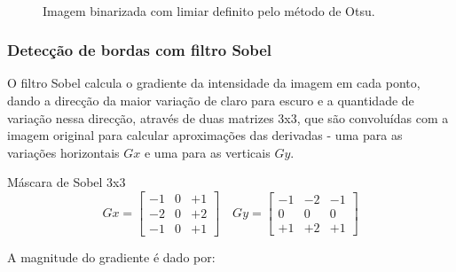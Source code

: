 \documentclass{sciposter}
\begin{document}
\begin{multicols}{3}
\begin{figure}[ht]
\centering
\mbox{\quad
{}}
\caption{ Imagem binarizada com limiar definito pelo método de Otsu. }
\label{fig:bin_otsu}
\end{figure}

\subsubsection*{Detecção de bordas com filtro Sobel}

O filtro Sobel calcula o gradiente da intensidade da imagem em cada ponto, dando a direcção da maior variação de claro para escuro e a quantidade de variação nessa direcção, através de duas matrizes 3x3, que são convoluídas com a imagem original para calcular aproximações das derivadas - uma para as variações horizontais $Gx$ e uma para as verticais $Gy$.
\begin{center}{Máscara de Sobel 3x3}
$$
Gx=\left[\begin{array}{rrr}
-1&0&+1\\
-2&0&+2 \\
-1&0&+1
\end{array}\right]\quad
Gy=\left[\begin{array}{ccc}
-1&-2&-1\\
0& 0& 0 \\
+1&+2&+1
\end{array}\right]
$$
\end{center}
A magnitude do gradiente é dado por:


\end{multicols}
\end{document}
